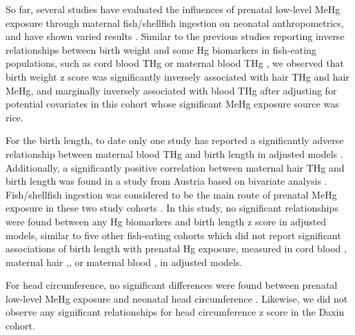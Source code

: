So far, several studies have evaluated the influences of prenatal low-level MeHg exposure through maternal fish/shellfish ingestion on neonatal anthropometrics, and have shown varied results \citep{daniels2007maternal,ramon2010fish,gundacker2010perinatal,lee2010interaction,ding2013prenatal,ou2015low,wells2016cord}
\citep{daniels2007maternal,ramon2010fish,gundacker2010perinatal,lee2010interaction,ding2013prenatal,ou2015low,wells2016cord}. Similar to the previous studies reporting inverse relationships between birth weight and some Hg biomarkers in fish-eating populations, such as cord blood THg \citep{ramon2010fish,lee2010interaction} or maternal blood THg \citep{lee2010interaction,ou2015low}, we observed that birth weight z score was significantly inversely associated with hair THg and hair MeHg, and marginally inversely associated with blood THg after adjusting for potential covariates in this cohort whose significant MeHg exposure source was rice.

For the birth length, to date only one study has reported a significantly adverse relationship between maternal blood THg and birth length in adjusted models \cite{ou2015low}. Additionally, a significantly positive correlation between maternal hair THg and birth length was found in a study from Austria based on bivariate analysis \cite{gundacker2010perinatal}. Fish/shellfish ingestion was considered to be the main route of prenatal MeHg exposure in these two study cohorts \citep{gundacker2010perinatal,ou2015low}. In this
study, no significant relationships were found between any Hg biomarkers and birth length z score in adjusted models, similar to five other fish-eating cohorts which did not report significant associations of birth length with prenatal Hg exposure, measured in cord blood \cite{lederman2008relation,ding2013prenatal,guo2013levels,wells2016cord}, maternal hair \citep{drouillet2010prenatal,guo2013levels},, or maternal blood \citep{lederman2008relation,ding2013prenatal}, in adjusted models. 

For head circumference, no significant differences were found between prenatal low-level MeHg exposure and neonatal head circumference \citep{lederman2008relation,drouillet2010prenatal,gundacker2010perinatal,ding2013prenatal,guo2013levels,wells2016cord}. Likewise, we did not observe any significant relationships for head circumference z score in the Daxin cohort.


